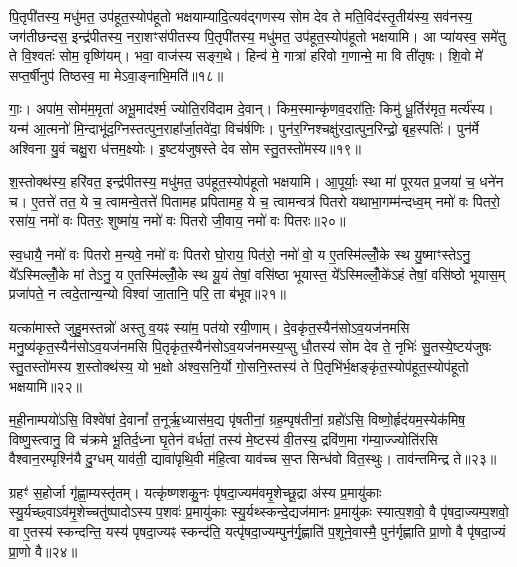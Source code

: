 पि॒तृपी॑तस्य॒ मधु॑मत॒ उप॑हूत॒स्योप॑हूतो भक्षयाम्यादि॒त्यव॑द्गणस्य सोम देव ते मति॒विद॑स्तृ॒तीय॑स्य॒ सव॑नस्य॒ जग॑तीछन्दस॒ इन्द्र॑पीतस्य॒ नरा॒शꣳस॑पीतस्य पि॒तृपी॑तस्य॒ मधु॑मत॒ उप॑हूत॒स्योप॑हूतो भक्षयामि। आ प्या॑यस्व॒ समे॑तु ते वि॒श्वतः॑ सोम॒ वृष्णि॑यम्। भवा॒ वाज॑स्य सङ्ग॒थे। हिन्व॑ मे॒ गात्रा॑ हरिवो ग॒णान्मे॒ मा वि ती॑तृषः। शि॒वो मे॑ सप्त॒र्\mbox{}षीनुप॑ तिष्ठस्व॒ मा मे\-ऽवा॒ङ्नाभि॒मति॑॥१८॥

गाः॒। अपा॑म॒ सोम॑म॒मृता॑ अभू॒माद॑र्श्म॒ ज्योति॒रवि॑दाम दे॒वान्। किम॒स्मान्कृ॑णव॒दरा॑तिः॒ किमु॑ धू॒र्तिर॑मृत॒ मर्त्य॑स्य। यन्म॑ आ॒त्मनो॑ मि॒न्दाभू॑द॒ग्निस्तत्पुन॒राहा᳚र्जा॒तवे॑दा॒ विच॑र्\mbox{}षणिः। पुन॑र॒ग्निश्चक्षु॑रदा॒त्पुन॒रिन्द्रो॒ बृह॒स्पतिः॑। पुन॑र्मे अश्विना यु॒वं चक्षु॒रा ध॑त्तम॒क्ष्योः। इ॒ष्टय॑जुषस्ते देव सोम स्तु॒तस्तो॑मस्य॥१९॥

श॒स्तोक्थ॑स्य॒ हरि॑वत॒ इन्द्र॑पीतस्य॒ मधु॑मत॒ उप॑हूत॒स्योप॑हूतो भक्षयामि। आ॒पूर्याः॒ स्था मा॑ पूरयत प्र॒जया॑ च॒ धने॑न च। ए॒तत्ते॑ तत॒ ये च॒ त्वामन्वे॒तत्ते॑ पितामह प्रपितामह॒ ये च॒ त्वामन्वत्र॑ पितरो यथाभा॒गम्म॑न्दध्व॒म् नमो॑ वः पितरो॒ रसा॑य॒ नमो॑ वः पितरः॒ शुष्मा॑य॒ नमो॑ वः पितरो जी॒वाय॒ नमो॑ वः पितरः॥२०॥

स्व॒धायै॒ नमो॑ वः पितरो म॒न्यवे॒ नमो॑ वः पितरो घो॒राय॒ पित॑रो॒ नमो॑ वो॒ य ए॒तस्मि॑ल्लोँ॒के स्थ यु॒ष्माꣳस्ते\-ऽनु॒ ये᳚\-ऽस्मिल्लोँ॒के मां ते\-ऽनु॒ य ए॒तस्मि॑ल्लोँ॒के स्थ यू॒यं तेषां॒ वसि॑ष्ठा भूयास्त॒ ये᳚\-ऽस्मिल्लोँ॒के॑\-ऽहं तेषां॒ वसि॑ष्ठो भूयास॒म् प्रजा॑पते॒ न त्वदे॒तान्य॒न्यो विश्वा॑ जा॒तानि॒ परि॒ ता ब॑भूव॥२१॥

यत्का॑मास्ते जुहु॒मस्तन्नो॑ अस्तु व॒यꣴ स्या॑म॒ पत॑यो रयी॒णाम्। दे॒वकृ॑त॒स्यैन॑सो\-ऽव॒यज॑नमसि मनु॒ष्य॑कृत॒स्यैन॑सो\-ऽ\-व॒यज॑नमसि पि॒तृकृ॑त॒स्यैन॑सो\-ऽव॒यज॑नमस्य॒प्सु धौ॒तस्य॑ सोम देव ते॒ नृभिः॑ सु॒तस्ये॒ष्टय॑जुषः स्तु॒तस्तो॑मस्य श॒स्तोक्थ॑स्य॒ यो भ॒क्षो अ॑श्व॒सनि॒र्यो गो॒सनि॒स्तस्य॑ ते पि॒तृभि॑र्भ॒क्षङ्कृ॑त॒स्योप॑हूत॒स्योप॑हूतो भक्षयामि॥२२॥

{}

म॒ही॒नाम्पयो॑\-ऽसि॒ विश्वे॑षां दे॒वानां᳚ त॒नूर्\mbox{}ऋ॒ध्यास॑म॒द्य पृ॑षतीनां॒ ग्रह॒म्पृष॑तीनां॒ ग्रहो॑\-ऽसि॒ विष्णो॒र्\mbox{}हृद॑यम॒स्येक॑मिष॒ विष्णु॒स्त्वानु॒ वि च॑क्रमे भू॒तिर्द॒ध्ना घृ॒तेन॑ वर्धतां॒ तस्य॑ मे॒ष्टस्य॑ वी॒तस्य॒ द्रवि॑ण॒मा ग॑म्या॒ज्ज्योति॑रसि वैश्वान॒रम्पृश्नि॑यै दु॒ग्धम् याव॑ती॒ द्यावा॑पृथि॒वी म॑हि॒त्वा याव॑च्च स॒प्त सिन्ध॑वो वित॒स्थुः। ताव॑न्तमिन्द्र ते॥२३॥

ग्रहꣳ॑ स॒होर्जा गृ॑ह्णा॒म्यस्तृ॑तम्। यत्कृ॑ष्णशकु॒नः पृ॑षदा॒ज्यम॑वमृ॒शेच्छू॒द्रा अ॑स्य प्र॒मायु॑काः स्यु॒र्यच्छ्वा\-ऽव॑मृ॒शेच्चतु॑ष्पादो\-ऽस्य प॒शवः॑ प्र॒मायु॑काः स्यु॒र्यथ्स्कन्दे॒द्यज॑मानः प्र॒मायु॑कः स्यात्प॒शवो॒ वै पृ॑षदा॒ज्यम्प॒शवो॒ वा ए॒तस्य॑ स्कन्दन्ति॒ यस्य॑ पृषदा॒ज्यꣴ स्कन्द॑ति॒ यत्पृ॑षदा॒ज्यम्पुन॑र्गृ॒ह्णाति॑ प॒शूने॒वास्मै॒ पुन॑र्गृह्णाति प्रा॒णो वै पृ॑षदा॒ज्यं प्रा॒णो वै॥२४॥

